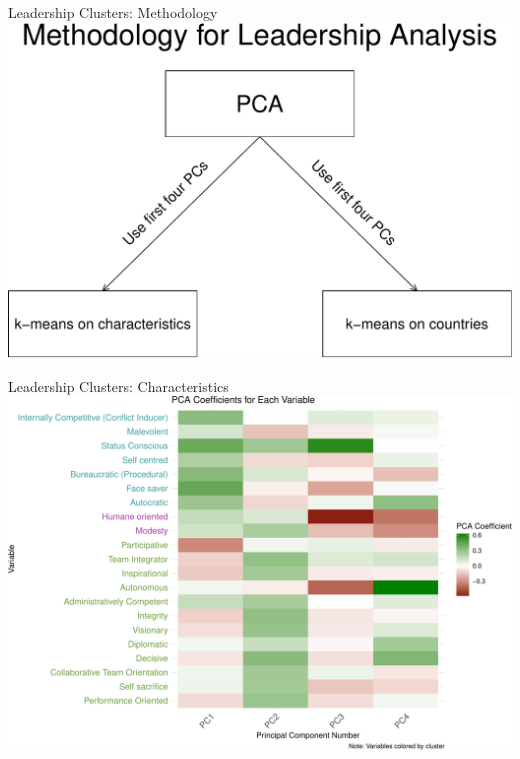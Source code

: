 \documentclass[
  ignorenonframetext,
]{beamer}
\begin{document}
\begin{frame}{Leadership Clusters: Methodology}
\protect\hypertarget{leadership-clusters-methodology-1}{}
\includegraphics{final_slides_files/figure-beamer/leader_methods-1.pdf}
\end{frame}

\begin{frame}{Leadership Clusters: Characteristics}
\protect\hypertarget{leadership-clusters-characteristics}{}
\includegraphics{final_slides_files/figure-beamer/pca_heatmap-1.pdf}
\end{frame}
\end{document}

